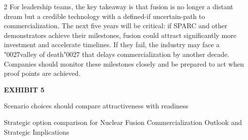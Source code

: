 \documentclass[10pt,a4paper]{article}
\newcommand{\BOApos}{{\BOQuoteFont\char"0027}}
\begin{document}
\begin{multicols}{2}
{\small For leadership teams, the key takeaway is that fusion is no longer a distant dream but a credible technology with a defined-if uncertain-path to commercialization. The next five years will be critical: if SPARC and other demonstrators achieve their milestones, fusion could attract significantly more investment and accelerate timelines. If they fail, the industry may face a \BOApos{}valley of death\BOApos{} that delays commercialization by another decade. Companies should monitor these milestones closely and be prepared to act when proof points are achieved.}\par
\end{multicols}
\label{chap:1:end}

\clearpage
{\textcolor{BOGreen}{\scriptsize\bfseries EXHIBIT 5}}\par\vspace{4pt}
{\sffamily\fontsize{17}{21}\selectfont\color{BONavy} Scenario choices should compare attractiveness with readiness}\par
{\small\color{BOText} Strategic option comparison for Nuclear Fusion Commercialization Outlook and Strategic Implications}\par\vspace{6pt}
\end{document}

